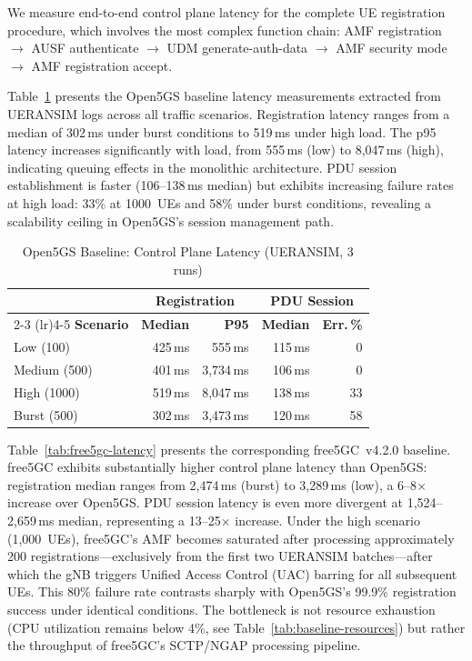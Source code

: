\documentclass[conference]{IEEEtran}
\begin{document}
We measure end-to-end control plane latency for the complete UE registration procedure, which involves the most complex function chain: AMF registration $\rightarrow$ AUSF authenticate $\rightarrow$ UDM generate-auth-data $\rightarrow$ AMF security mode $\rightarrow$ AMF registration accept.

Table~\ref{tab:open5gs-latency} presents the Open5GS baseline latency measurements extracted from UERANSIM logs across all traffic scenarios. Registration latency ranges from a median of 302\,ms under burst conditions to 519\,ms under high load. The p95 latency increases significantly with load, from 555\,ms (low) to 8,047\,ms (high), indicating queuing effects in the monolithic architecture. PDU session establishment is faster (106--138\,ms median) but exhibits increasing failure rates at high load: 33\% at 1000~UEs and 58\% under burst conditions, revealing a scalability ceiling in Open5GS's session management path.

\begin{table}[t]
\centering
\caption{Open5GS Baseline: Control Plane Latency (UERANSIM, 3 runs)}
\label{tab:open5gs-latency}
\footnotesize
\begin{tabular}{@{}lrrrr@{}}
\toprule
 & \multicolumn{2}{c}{\textbf{Registration}} & \multicolumn{2}{c}{\textbf{PDU Session}} \\
\cmidrule(lr){2-3} \cmidrule(lr){4-5}
\textbf{Scenario} & \textbf{Median} & \textbf{P95} & \textbf{Median} & \textbf{Err.\,\%} \\
\midrule
Low (100)    & 425\,ms  & 555\,ms   & 115\,ms  & 0  \\
Medium (500) & 401\,ms  & 3,734\,ms & 106\,ms  & 0  \\
High (1000)  & 519\,ms  & 8,047\,ms & 138\,ms  & 33 \\
Burst (500)  & 302\,ms  & 3,473\,ms & 120\,ms  & 58 \\
\bottomrule
\end{tabular}
\end{table}

Table~\ref{tab:free5gc-latency} presents the corresponding free5GC~v4.2.0 baseline. free5GC exhibits substantially higher control plane latency than Open5GS: registration median ranges from 2,474\,ms (burst) to 3,289\,ms (low), a 6--8$\times$ increase over Open5GS. PDU session latency is even more divergent at 1,524--2,659\,ms median, representing a 13--25$\times$ increase. Under the high scenario (1,000~UEs), free5GC's AMF becomes saturated after processing approximately 200 registrations---exclusively from the first two UERANSIM batches---after which the gNB triggers Unified Access Control (UAC) barring for all subsequent UEs. This 80\% failure rate contrasts sharply with Open5GS's 99.9\% registration success under identical conditions. The bottleneck is not resource exhaustion (CPU utilization remains below 4\%, see Table~\ref{tab:baseline-resources}) but rather the throughput of free5GC's SCTP/NGAP processing pipeline.
\end{document}

